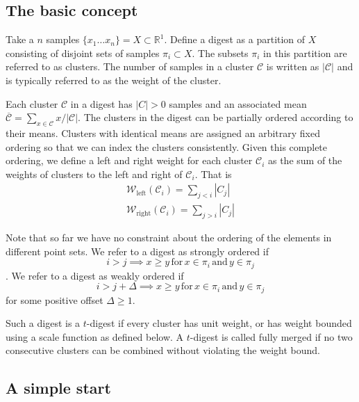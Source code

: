 \documentclass[]{statsoc}
\begin{document}
\subsection{The basic concept}
Take a $n$ samples $\lbrace x_1 \ldots x_n \rbrace = X \subset \mathbb R^1$. Define a digest  as a partition of $X$ consisting of disjoint  sets of samples $\pi_i \subset X$. The subsets $\pi_i$  in this partition are referred to as clusters. The number of samples in a cluster $\mathcal C$ is written as $|\mathcal C|$ and is typically referred to as the weight of the cluster.
 
Each cluster $\mathcal C$ in a digest has $|C|>0$ samples and an associated mean $\overline {\mathcal C} = \sum_{x\in \mathcal C} x / |\mathcal C|$. The clusters in the digest can be partially ordered according to their means. Clusters with identical means are assigned an arbitrary fixed ordering so that we can index the clusters consistently. Given this complete ordering, we define a left and right weight for each cluster $\mathcal C_i$ as the sum of the weights of clusters to the left and right of $\mathcal C_i$. That is
\begin{align*}
\mathcal W_{\mathrm{left}}(\mathcal C_i) = \sum_{j < i} |C_j| \\
\mathcal W_{\mathrm{right}}(\mathcal C_i) = \sum_{j > i} |C_j|
\end{align*}

Note that so far we have no constraint about the ordering of the elements in different point sets. We refer to a digest as strongly ordered if 
\begin{equation}\label{eq:weak-ordering}
 i > j \implies x \ge y \mathrm{\,for\,} x \in \pi_i \mathrm{\,and\,} y \in \pi_j
 \end{equation}
. We refer to a digest as weakly ordered if
\begin{equation}\label{eq:strong-ordering}
 i > j+\Delta \implies x \ge y \mathrm{\,for\,} x \in \pi_i \mathrm{\,and\,} y \in \pi_j
 \end{equation}
for some positive offset $\Delta\ge 1$.

Such a digest is a $t$-digest if every cluster has unit weight, or has weight bounded using a scale function as defined below. A $t$-digest is called fully merged if no two consecutive clusters can be combined without violating the weight bound.

\subsection{A simple start}
\end{document}
